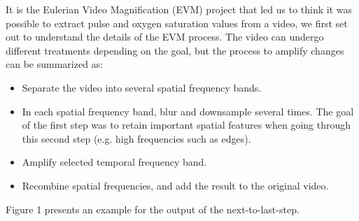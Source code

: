 \documentclass[12pt]{article}
\begin{document}
  It is the Eulerian Video Magnification (EVM) project that led us to think it was possible to extract pulse and oxygen saturation values from a video,
  we first set out to understand the details of the EVM process. The video can undergo different treatments depending on the goal, but the process to amplify changes 
  can be summarized as:

  \begin{itemize}
    \item Separate the video into several spatial frequency bands.
    \item In each spatial frequency band, blur and downsample several times. The goal of the first step was to retain important spatial features when going through this second step (e.g. high frequencies such as edges).
    \item Amplify selected temporal frequency band.
    \item Recombine spatial frequencies, and add the result to the original video.
  \end{itemize}
  Figure 1 presents an example for the output of the next-to-last-step. 
\end{document}
